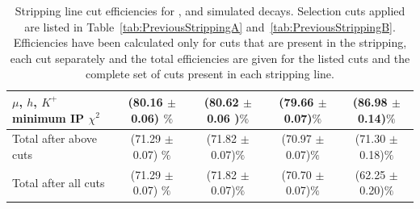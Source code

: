 {\begin{landscape}
\begin{table}[htbp]
\begin{center}
\begin{tabular}{lcccc}
$\mu$, $h$, $K^{+}$ minimum IP $\chi^{2}$    & (80.16 $\pm$ 0.06) $\%$  & (80.62 $\pm$ 0.06 )$\%$        & (79.66 $\pm$ 0.07)$\%$        & (86.98 $\pm$ 0.14)$\%$ \\
\hline
Total after above cuts                  & (71.29 $\pm$  0.07) $\%$  & (71.82 $\pm$ 0.07)$\%$        & (70.97 $\pm$ 0.07)$\%$        & (71.30 $\pm$ 0.18)$\%$ \\
\hline
Total after all cuts      & (71.29 $\pm$  0.07) $\%$                & (71.82 $\pm$ 0.07)$\%$            & (70.70 $\pm$ 0.07)$\%$        & (62.25 $\pm$ 0.20)$\%$ \\
\hline
\end{tabular}
\vspace{0.7cm}
\caption{Stripping line cut efficiencies for \bsmumu, \bhh and  simulated decays. Selection cuts applied are listed in Table~\ref{tab:PreviousStrippingA} and~\ref{tab:PreviousStrippingB}. Efficiencies have been calculated only for cuts that are present in the \bsmumu stripping, each cut separately and the total efficiencies are given for the listed cuts and the complete set of cuts present in each stripping line. }
\label{tab:Run1strippingEff}
\end{center}
\end{table} 
\vspace*{\fill}
\end{landscape}
}


